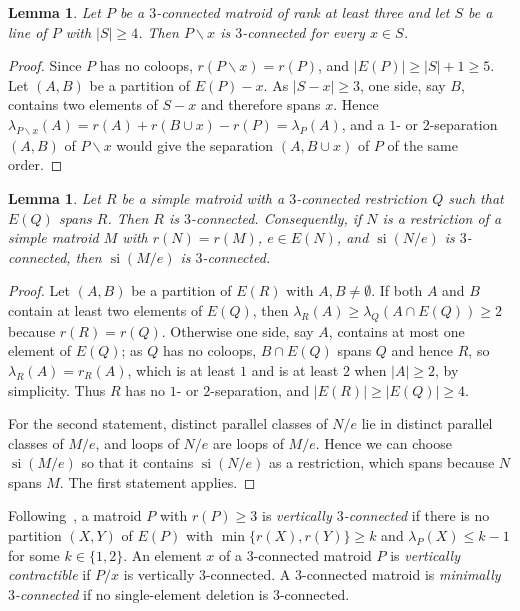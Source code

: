 \documentclass[11pt]{amsart}
\newtheorem{lemma}[theorem]{Lemma}
\theoremstyle{definition}
\theoremstyle{remark}
\numberwithin{equation}{section}
\newcommand{\si}{\operatorname{si}}
\newcommand{\lam}{\lambda}
\begin{document}
\begin{lemma}\label{lem:delete4}
Let $P$ be a $3$-connected matroid of rank at least three and let $S$ be a line of $P$ with $|S|\ge4$. Then $P\backslash x$ is $3$-connected for every $x\in S$.
\end{lemma}

\begin{proof}
Since $P$ has no coloops, $r(P\backslash x)=r(P)$, and $|E(P)|\ge|S|+1\ge5$. Let $(A,B)$ be a partition of $E(P)-x$. As $|S-x|\ge3$, one side, say $B$, contains two elements of $S-x$ and therefore spans $x$. Hence $\lam_{P\backslash x}(A)=r(A)+r(B\cup x)-r(P)=\lam_P(A)$, and a $1$- or $2$-separation $(A,B)$ of $P\backslash x$ would give the separation $(A,B\cup x)$ of $P$ of the same order.
\end{proof}

\begin{lemma}\label{lem:spanning}
Let $R$ be a simple matroid with a $3$-connected restriction $Q$ such that $E(Q)$ spans $R$. Then $R$ is $3$-connected. Consequently, if $N$ is a restriction of a simple matroid $M$ with $r(N)=r(M)$, $e\in E(N)$, and $\si(N/e)$ is $3$-connected, then $\si(M/e)$ is $3$-connected.
\end{lemma}

\begin{proof}
Let $(A,B)$ be a partition of $E(R)$ with $A,B\ne\emptyset$. If both $A$ and $B$ contain at least two elements of $E(Q)$, then $\lam_R(A)\ge\lam_Q(A\cap E(Q))\ge2$ because $r(R)=r(Q)$. Otherwise one side, say $A$, contains at most one element of $E(Q)$; as $Q$ has no coloops, $B\cap E(Q)$ spans $Q$ and hence $R$, so $\lam_R(A)=r_R(A)$, which is at least $1$ and is at least $2$ when $|A|\ge2$, by simplicity. Thus $R$ has no $1$- or $2$-separation, and $|E(R)|\ge|E(Q)|\ge4$.

For the second statement, distinct parallel classes of $N/e$ lie in distinct parallel classes of $M/e$, and loops of $N/e$ are loops of $M/e$. Hence we can choose $\si(M/e)$ so that it contains $\si(N/e)$ as a restriction, which spans because $N$ spans $M$. The first statement applies.
\end{proof}

Following~\cite[p.~163]{Oxl96}, a matroid $P$ with $r(P)\ge3$ is \emph{vertically $3$-connected} if there is no partition $(X,Y)$ of $E(P)$ with $\min\{r(X),r(Y)\}\ge k$ and $\lam_P(X)\le k-1$ for some $k\in\{1,2\}$. An element $x$ of a $3$-connected matroid $P$ is \emph{vertically contractible} if $P/x$ is vertically $3$-connected. A $3$-connected matroid is \emph{minimally $3$-connected} if no single-element deletion is $3$-connected.
\end{document}
